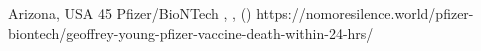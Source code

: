           {Arizona, USA}
          {45}
          {Pfizer/BioNTech}
          {}
          {
            ,
            ,
             ()
          }
          {https://nomoresilence.world/pfizer-biontech/geoffrey-young-pfizer-vaccine-death-within-24-hrs/}
